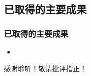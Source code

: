 \documentclass{beamer}
\theoremstyle{remark}
\begin{document}
\subsection{已取得的主要成果}
\begin{frame}
	\frametitle{已取得的主要成果}
	\begin{itemize}
		\item 
	\end{itemize}

\end{frame}

\LogoOff

{


\begin{frame}
    \begin{center}
    \Huge 
    {
	    感谢聆听！敬请批评指正！
    }
    \end{center}
\end{frame}

}
\end{document}
